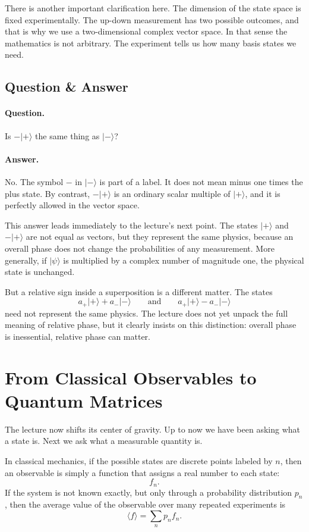 There is another important clarification here. The dimension of the state space is fixed experimentally. The up-down measurement has two possible outcomes, and that is why we use a two-dimensional complex vector space. In that sense the mathematics is not arbitrary. The experiment tells us how many basis states we need.

\subsection{Question \& Answer}

\paragraph{Question.} Is \(-|+\rangle\) the same thing as \(|-\rangle\)?

\paragraph{Answer.} No. The symbol \(-\) in \(|-\rangle\) is part of a label. It does not mean minus one times the plus state. By contrast, \(-|+\rangle\) is an ordinary scalar multiple of \(|+\rangle\), and it is perfectly allowed in the vector space.

This answer leads immediately to the lecture's next point. The states \(|+\rangle\) and \(-|+\rangle\) are not equal as vectors, but they represent the same physics, because an overall phase does not change the probabilities of any measurement. More generally, if \(|\psi\rangle\) is multiplied by a complex number of magnitude one, the physical state is unchanged.

But a relative sign inside a superposition is a different matter. The states
\[
a_+|+\rangle+a_-|-\rangle
\qquad \text{and} \qquad
a_+|+\rangle-a_-|-\rangle
\]
need not represent the same physics. The lecture does not yet unpack the full meaning of relative phase, but it clearly insists on this distinction: overall phase is inessential, relative phase can matter.

\section{From Classical Observables to Quantum Matrices}

The lecture now shifts its center of gravity. Up to now we have been asking what a state is. Next we ask what a measurable quantity is.

In classical mechanics, if the possible states are discrete points labeled by \(n\), then an observable is simply a function that assigns a real number to each state:
\[
f_n.
\]
If the system is not known exactly, but only through a probability distribution \(p_n\), then the average value of the observable over many repeated experiments is
\begin{equation}
\langle f\rangle=\sum_n p_n f_n.
\end{equation}

